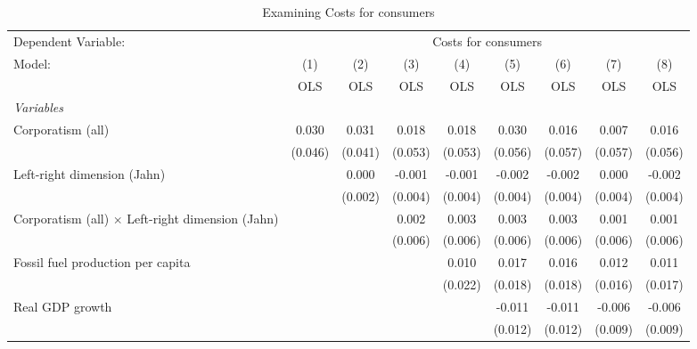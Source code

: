 
\begin{table}[htbp]
   \caption{Examining Costs for consumers}
   \centering
   \begin{tabular}{lcccccccc}
      \toprule
      Dependent Variable: & \multicolumn{8}{c}{Costs for consumers}\\
      Model:                                                  & (1)     & (2)     & (3)     & (4)     & (5)     & (6)     & (7)     & (8)\\  
                                                              &  OLS    & OLS     & OLS     & OLS     & OLS     & OLS     & OLS     & OLS\\  
      \midrule
      \emph{Variables}\\
      Corporatism (all)                                       & 0.030   & 0.031   & 0.018   & 0.018   & 0.030   & 0.016   & 0.007   & 0.016\\   
                                                              & (0.046) & (0.041) & (0.053) & (0.053) & (0.056) & (0.057) & (0.057) & (0.056)\\   
      Left-right dimension (Jahn)                             &         & 0.000   & -0.001  & -0.001  & -0.002  & -0.002  & 0.000   & -0.002\\   
                                                              &         & (0.002) & (0.004) & (0.004) & (0.004) & (0.004) & (0.004) & (0.004)\\   
      Corporatism (all) $\times$ Left-right dimension (Jahn)  &         &         & 0.002   & 0.003   & 0.003   & 0.003   & 0.001   & 0.001\\   
                                                              &         &         & (0.006) & (0.006) & (0.006) & (0.006) & (0.006) & (0.006)\\   
      Fossil fuel production per capita                       &         &         &         & 0.010   & 0.017   & 0.016   & 0.012   & 0.011\\   
                                                              &         &         &         & (0.022) & (0.018) & (0.018) & (0.016) & (0.017)\\   
      Real GDP growth                                         &         &         &         &         & -0.011  & -0.011  & -0.006  & -0.006\\   
                                                              &         &         &         &         & (0.012) & (0.012) & (0.009) & (0.009)\\   

\end{tabular}
\end{table}
